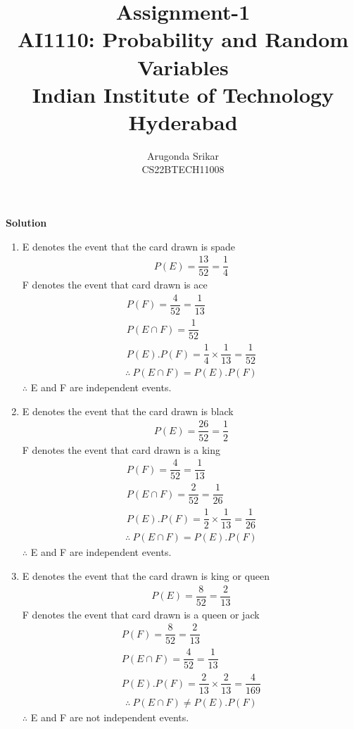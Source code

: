 \documentclass[12pt, journal]{IEEEtran}
\title{Assignment-1 \\ \Large AI1110: Probability and Random Variables \\ \large Indian Institute of Technology Hyderabad}
\author{Arugonda Srikar \\ \normalsize CS22BTECH11008}
\begin{document}
	\maketitle

	\textbf{Solution}

	\begin{enumerate}[label=(\roman*)]
		\item 
			E denotes the event that the card drawn is spade 
			\begin{align}
				P(E) = \dfrac{13}{52} = \dfrac{1}{4}
			\end{align}
			F denotes the event that card drawn is ace 
			\begin{align}
				P(F) = \dfrac{4}{52} = \dfrac{1}{13} \\
				P(E \cap F) = \dfrac{1}{52}\\
				P(E).P(F) = \dfrac{1}{4} \times \dfrac{1}{13} = \dfrac{1}{52}
			\end{align}
			\begin{align}
				\therefore~P(E \cap F) = P(E).P(F)
			\end{align}
			$\therefore$  E and F are independent events. \\
		\item
			E denotes the event that the card drawn is black 
			\begin{align}
				P(E) = \dfrac{26}{52} = \dfrac{1}{2}
			\end{align}
			F denotes the event that card drawn is a king 
			\begin{align}
				P(F) = \dfrac{4}{52} = \dfrac{1}{13} \\
				P(E \cap F) = \dfrac{2}{52} = \dfrac{1}{26} \\
				P(E).P(F) = \dfrac{1}{2} \times \dfrac{1}{13} = \dfrac{1}{26}
			\end{align}
			\begin{align}
				\therefore~P(E \cap F) = P(E).P(F)
			\end{align}
			$\therefore$  E and F are independent events. \\
		\item
			E denotes the event that the card drawn is king or queen
			\begin{align}
				P(E) = \dfrac{8}{52} = \dfrac{2}{13}
			\end{align}
			F denotes the event that card drawn is a queen or jack 
			\begin{align}
				P(F) = \dfrac{8}{52} = \dfrac{2}{13} \\
				P(E \cap F) = \dfrac{4}{52} = \dfrac{1}{13}\\
				P(E).P(F) = \dfrac{2}{13} \times \dfrac{2}{13} = \dfrac{4}{169}
			\end{align}
			\begin{align}
				\therefore~P(E \cap F) \neq P(E).P(F)
			\end{align}
			$\therefore$  E and F are not independent events. \\
		
	\end{enumerate}
\end{document}
